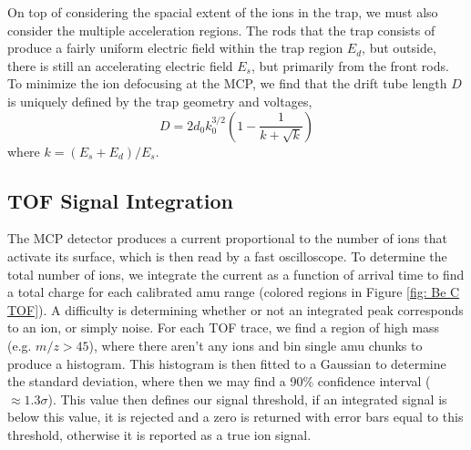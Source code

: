 On top of considering the spacial extent of the ions in the trap, we must also consider the multiple acceleration regions. The rods that the trap consists of produce a fairly uniform electric field within the trap region $E_d$, but outside, there is still an accelerating electric field $E_s$, but primarily from the front rods. To minimize the ion defocusing at the MCP, we find that the drift tube length $D$ is uniquely defined by the trap geometry and voltages,\cite{Wiley1955}
\begin{equation}
	D = 2d_0 k_0^{3/2}\left(1-\frac{1}{k+\sqrt{k}}\right)
\end{equation}
where $k = (E_s + E_d)/E_s$.

\subsection{TOF Signal Integration}

The MCP detector produces a current proportional to the number of ions that activate its surface, which is then read by a fast oscilloscope. To determine the total number of ions, we integrate the current as a function of arrival time to find a total charge for each calibrated amu range (colored regions in Figure \ref{fig: Be C TOF}). A difficulty is determining whether or not an integrated peak corresponds to an ion, or simply noise. For each TOF trace, we find a region of high mass (e.g. $m/z > 45$), where there aren't any ions and bin single amu chunks to produce a histogram. This histogram is then fitted to a Gaussian to determine the standard deviation, where then we may find a 90\% confidence interval ($\approx 1.3 \sigma$). This value then defines our signal threshold, if an integrated signal is below this value, it is rejected and a zero is returned with error bars equal to this threshold, otherwise it is reported as a true ion signal.
